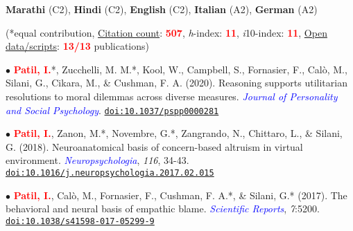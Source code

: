 \documentclass[10pt]{article}
\begin{document}
	

	\textbf{Marathi} (C2), \textbf{Hindi} (C2), \textbf{English} (C2), \textbf{Italian} (A2), \textbf{German} (A2)
	
	\begin{center}
	(*equal contribution, \href{https://scholar.google.it/citations?user=kSYuYTUAAAAJ&hl=en&oi=ao}{Citation count}: \textbf{\textcolor{red}{507}}, \textit{h}-index: \textbf{\textcolor{red}{11}}, \textit{i}10-index: \textbf{\textcolor{red}{11}}, \href{https://osf.io/hk5f3/}{Open data/scripts}: \textbf{\textcolor{red}{13/13}} publications)\\
	\end{center}

	$\bullet$ \textbf{\textcolor{red}{Patil, I.}}*, Zucchelli, M. M.*, Kool, W., Campbell, S., Fornasier, F., Cal\`{o}, M., Silani, G., Cikara, M., \& \hspace*{0.1in}Cushman, F. A. (2020). Reasoning supports utilitarian resolutions to moral dilemmas across diverse \hspace*{0.1in}measures. \textit{\textcolor{blue}{Journal of Personality and Social Psychology}}. \href{https://psyarxiv.com/q86vx/}{\tt doi:10.1037/pspp0000281}
	\miniskip
	
	$\bullet$ \textbf{\textcolor{red}{Patil, I.}}, Zanon, M.*, Novembre, G.*, Zangrando, N., Chittaro, L., \& Silani, G. (2018). Neuroanatomical \hspace*{0.1in}basis of concern-based altruism in virtual environment. \textit{\textcolor{blue}{Neuropsychologia}}, \textit{116}, 34-43. \hspace*{0.1in}\href{https://drive.google.com/open?id=0B6_u70YpdJKnWU0zblpBOUMxRXc}{\tt doi:10.1016/j.neuropsychologia.2017.02.015}
	\miniskip	
	
	$\bullet$ \textbf{\textcolor{red}{Patil, I.}}, Cal\`{o}, M., Fornasier, F., Cushman, F. A.*, \& Silani, G.* (2017). The behavioral and neural basis of \hspace*{0.1in}empathic blame. 
	\textit{\textcolor{blue}{Scientific Reports}}, \textit{7}:5200. \href{https://drive.google.com/open?id=0B6_u70YpdJKnT1J6dkk5R1NPZDg}{\tt doi:10.1038/s41598-017-05299-9}
	\miniskip
	
\end{document}
